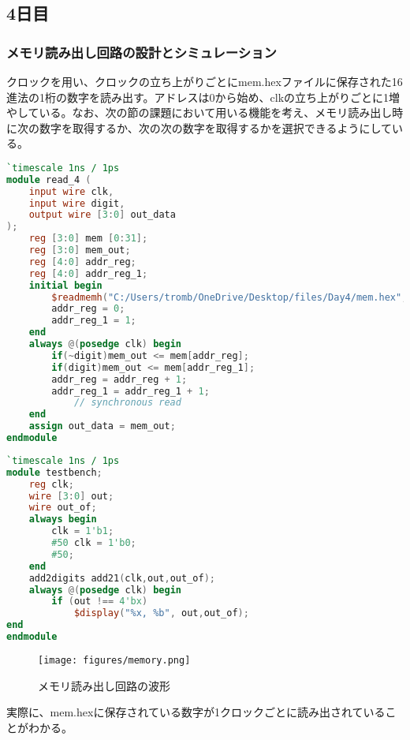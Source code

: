 \documentclass[titlepage]{ltjsarticle}
\begin{document}
\subsection{4日目}
\subsubsection{メモリ読み出し回路の設計とシミュレーション}
クロックを用い、クロックの立ち上がりごとにmem.hexファイルに保存された16進法の1桁の数字を読み出す。アドレスは0から始め、clkの立ち上がりごとに1増やしている。なお、次の節の課題において用いる機能を考え、メモリ読み出し時に次の数字を取得するか、次の次の数字を取得するかを選択できるようにしている。
\begin{lstlisting}[caption=メモリ読み出し回路デザイン,language=verilog]
`timescale 1ns / 1ps 
module read_4 ( 
    input wire clk,
    input wire digit,
    output wire [3:0] out_data
);
    reg [3:0] mem [0:31];
    reg [3:0] mem_out;
    reg [4:0] addr_reg;
    reg [4:0] addr_reg_1;
    initial begin
        $readmemh("C:/Users/tromb/OneDrive/Desktop/files/Day4/mem.hex", mem);
        addr_reg = 0;
        addr_reg_1 = 1;
    end
    always @(posedge clk) begin
        if(~digit)mem_out <= mem[addr_reg];
        if(digit)mem_out <= mem[addr_reg_1];
        addr_reg = addr_reg + 1;
        addr_reg_1 = addr_reg_1 + 1;
            // synchronous read
    end
    assign out_data = mem_out;
endmodule
\end{lstlisting}
\begin{lstlisting}[caption=メモリ読み出し回路テストベンチ,language=verilog]
`timescale 1ns / 1ps
module testbench;
    reg clk;
    wire [3:0] out;
    wire out_of;
    always begin
        clk = 1'b1;
        #50 clk = 1'b0;
        #50;
    end
    add2digits add21(clk,out,out_of);
    always @(posedge clk) begin
        if (out !== 4'bx)
            $display("%x, %b", out,out_of);
end
endmodule
\end{lstlisting}
\begin{figure}[H]
    \begin{center}
        \texttt{[image: figures/memory.png]}
        \caption{メモリ読み出し回路の波形}
    \end{center}
\end{figure}
実際に、mem.hexに保存されている数字が1クロックごとに読み出されていることがわかる。
\end{document}
